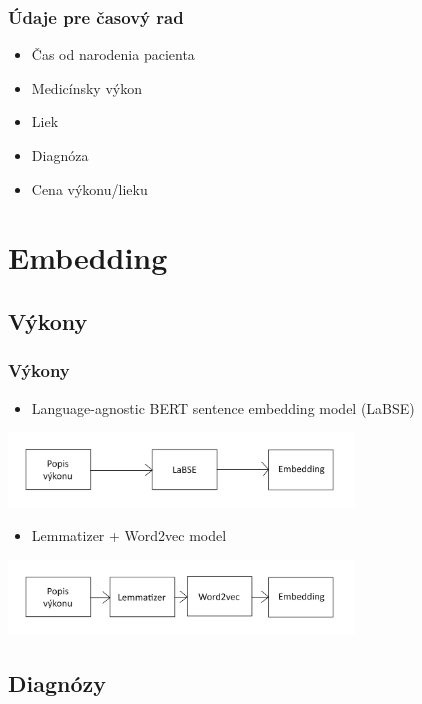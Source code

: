 \documentclass[slovak]{beamer}
\begin{document}
\begin{frame}  
	\frametitle{Údaje pre časový rad}
	\begin{itemize}
		\item<1> Čas od narodenia pacienta
		\item<1> Medicínsky výkon
		\item<1> Liek 
		\item<1> Diagnóza
		\item<1> Cena výkonu/lieku
	\end{itemize} 
\end{frame}

\section{Embedding}

\subsection{Výkony}

\begin{frame}
	\frametitle{Výkony}
	\begin{itemize}
		\item<1> Language-agnostic BERT sentence embedding model (LaBSE)
	\end{itemize}
		
	\begin{center}
		\includegraphics[height=2cm]{images/LaBSE.png}
	\end{center}
	
	\begin{itemize}
		\item<1> Lemmatizer + Word2vec model
	\end{itemize}
	
	\begin{center}
		\includegraphics[height=2cm]{images/LemW2v.png}
	\end{center}
\end{frame}

\subsection{Diagnózy}
\end{document}
